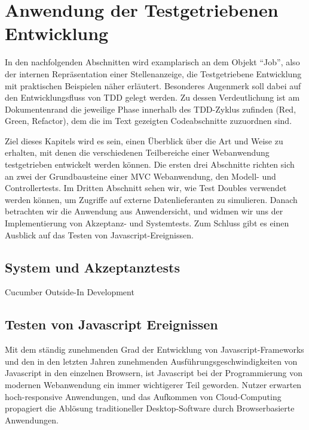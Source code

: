 \section{Anwendung der Testgetriebenen Entwicklung}
\label{sec:awtdd}

In den nachfolgenden Abschnitten wird examplarisch an dem Objekt "`Job"', also der internen Repräsentation einer Stellenanzeige, die Testgetriebene Entwicklung mit praktischen Beispielen näher erläutert.
Besonderes Augenmerk soll dabei auf den Entwicklungsfluss von TDD gelegt werden. Zu dessen Verdeutlichung ist am Dokumentenrand die jeweilige Phase innerhalb des TDD-Zyklus zufinden (Red, Green, Refactor), dem die im Text gezeigten Codeabschnitte zuzuordnen sind.

Ziel dieses Kapitels wird es sein, einen Überblick über die Art und Weise zu erhalten, mit denen die verschiedenen Teilbereiche einer Webanwendung testgetrieben entwickelt werden können.
Die ersten drei Abschnitte richten sich an zwei der Grundbausteine einer MVC %
Webanwendung, den Modell- und Controllertests. Im Dritten Abschnitt sehen wir, wie Test Doubles verwendet werden können, um Zugriffe auf externe Datenlieferanten zu simulieren. Danach betrachten wir die Anwendung aus Anwendersicht, und widmen wir uns der Implementierung von Akzeptanz- und Systemtests. %
Zum Schluss gibt es einen Ausblick auf das Testen von Javascript-Ereignissen.









\subsection{System und Akzeptanztests}
\label{sec:system}
Cucumber Outside-In Development


\subsection{Testen von Javascript Ereignissen}

Mit dem ständig zunehmenden Grad der Entwicklung von Javascript-Frameworks und den in den letzten Jahren zunehmenden Ausführungsgeschwindigkeiten von Javascript in den einzelnen Browsern, ist Javascript bei der Programmierung von modernen Webanwendung ein immer wichtigerer Teil geworden. Nutzer erwarten hoch-responsive Anwendungen, und das Aufkommen von Cloud-Computing propagiert die Ablösung traditioneller Desktop-Software durch Browserbasierte Anwendungen.




